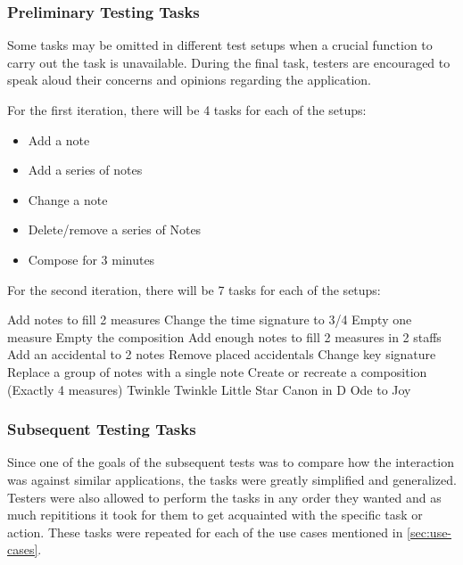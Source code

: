 			\subsubsection{Preliminary Testing Tasks}
			\label{sec:preliminary-tasks}

				Some tasks may be omitted in different test setups when a crucial function to carry out the task is unavailable. During the final task, testers are encouraged to speak aloud their concerns and opinions regarding the application.

				For the first iteration, there will be 4 tasks for each of the setups:
				\begin{itemize}
					\item Add a note
					\item Add a series of notes
					\item Change a note
					\item Delete/remove a series of Notes
					\item Compose for 3 minutes
				\end{itemize}

				For the second iteration, there will be 7 tasks for each of the setups:
				\begin{outline}
					\1 Add notes to fill 2 measures
					\1 Change the time signature to 3/4
					\1 Empty one measure
					\1 Empty the composition
					\1 Add enough notes to fill 2 measures in 2 staffs
					\1 Add an accidental to 2 notes
					\1 Remove placed accidentals 
					\1 Change key signature
					\1 Replace a group of notes with a single note
					\1 Create or recreate a composition (Exactly 4 measures)
						\2 Twinkle Twinkle Little Star
						\2 Canon in D
						\2 Ode to Joy
				\end{outline}

			\subsubsection{Subsequent Testing Tasks}
			\label{sec:subsequent-tasks}

				Since one of the goals of the subsequent tests was to compare how the interaction was against similar applications, the tasks were greatly simplified and generalized. Testers were also allowed to perform the tasks in any order they wanted and as much repititions it took for them to get acquainted with the specific task or action. These tasks were repeated for each of the use cases mentioned in \ref{sec:use-cases}.

